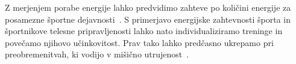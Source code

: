 Z merjenjem porabe energije lahko predvidimo zahteve po količini energije za posamezne športne dejavnosti~\cite{botton2011energy,osgnach2010energy}. S primerjavo energijske zahtevnosti športa in športnikove telesne pripravljenosti lahko nato individualiziramo treninge in povečamo njihovo učinkovitost. Prav tako lahko predčasno ukrepamo pri preobremenitvah, ki vodijo v mišično utrujenost~\cite{sahlin1998energy,reilly1997energetics}.

\renewcommand{\folder}{./pogl/01-uvod}





